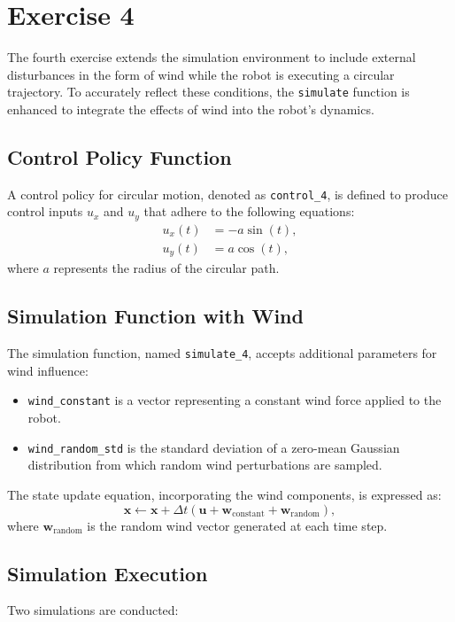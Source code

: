 \documentclass[letterpaper, 10 pt, conference]{ieeeconf}  %
\begin{document}
\section{Exercise 4}

The fourth exercise extends the simulation environment to include external disturbances in the form of wind while the robot is executing a circular trajectory. To accurately reflect these conditions, the \texttt{simulate} function is enhanced to integrate the effects of wind into the robot's dynamics.

\subsection*{Control Policy Function}
A control policy for circular motion, denoted as \texttt{control\_4}, is defined to produce control inputs \( u_x \) and \( u_y \) that adhere to the following equations:
\begin{align}
    u_x(t) &= -a \sin(t), \\
    u_y(t) &= a \cos(t),
\end{align}
where \( a \) represents the radius of the circular path.

\subsection*{Simulation Function with Wind}
The simulation function, named \texttt{simulate\_4}, accepts additional parameters for wind influence:
\begin{itemize}
    \item \texttt{wind\_constant} is a vector representing a constant wind force applied to the robot.
    \item \texttt{wind\_random\_std} is the standard deviation of a zero-mean Gaussian distribution from which random wind perturbations are sampled.
\end{itemize}

The state update equation, incorporating the wind components, is expressed as:
\begin{equation}
    \mathbf{x} \leftarrow \mathbf{x} + \Delta t (\mathbf{u} + \mathbf{w}_{\text{constant}} + \mathbf{w}_{\text{random}}),
\end{equation}
where \( \mathbf{w}_{\text{random}} \) is the random wind vector generated at each time step.

\subsection*{Simulation Execution}
Two simulations are conducted:
\end{document}
